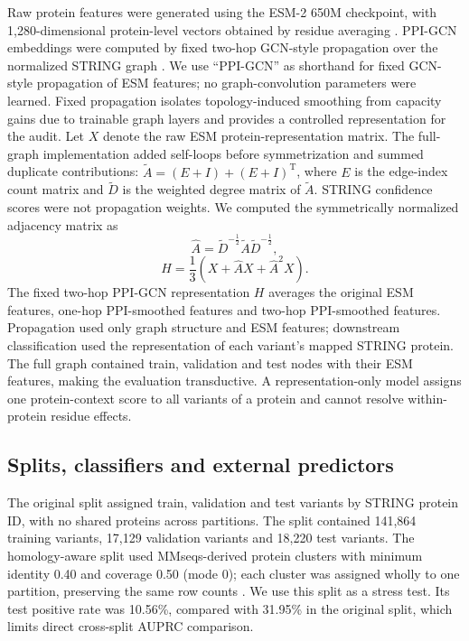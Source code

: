 \documentclass[conference]{IEEEtran}
\begin{document}
Raw protein features were generated using the ESM-2 650M checkpoint, with 1,280-dimensional protein-level vectors obtained by residue averaging \cite{Lin2023ESM}. PPI-GCN embeddings were computed by fixed two-hop GCN-style propagation over the normalized STRING graph \cite{Kipf2017GCN}. We use ``PPI-GCN'' as shorthand for fixed GCN-style propagation of ESM features; no graph-convolution parameters were learned. Fixed propagation isolates topology-induced smoothing from capacity gains due to trainable graph layers and provides a controlled representation for the audit. Let $X$ denote the raw ESM protein-representation matrix. The full-graph implementation added self-loops before symmetrization and summed duplicate contributions: $\tilde{A}=(E+I)+(E+I)^{\mathrm{T}}$, where $E$ is the edge-index count matrix and $\tilde{D}$ is the weighted degree matrix of $\tilde{A}$. STRING confidence scores were not propagation weights. We computed the symmetrically normalized adjacency matrix as
\begin{equation}
\hat{A}=\tilde{D}^{-\frac{1}{2}}\tilde{A}\tilde{D}^{-\frac{1}{2}},
\end{equation}
\begin{equation}
H=\frac{1}{3}\left(X+\hat{A}X+\hat{A}^{2}X\right).
\end{equation}
The fixed two-hop PPI-GCN representation $H$ averages the original ESM features, one-hop PPI-smoothed features and two-hop PPI-smoothed features. Propagation used only graph structure and ESM features; downstream classification used the representation of each variant's mapped STRING protein. The full graph contained train, validation and test nodes with their ESM features, making the evaluation transductive. A representation-only model assigns one protein-context score to all variants of a protein and cannot resolve within-protein residue effects.

\subsection{Splits, classifiers and external predictors}

The original split assigned train, validation and test variants by STRING protein ID, with no shared proteins across partitions. The split contained 141,864 training variants, 17,129 validation variants and 18,220 test variants. The homology-aware split used MMseqs-derived protein clusters with minimum identity 0.40 and coverage 0.50 (mode 0); each cluster was assigned wholly to one partition, preserving the same row counts \cite{Steinegger2017MMseqs2}. We use this split as a stress test. Its test positive rate was 10.56\%, compared with 31.95\% in the original split, which limits direct cross-split AUPRC comparison.
\end{document}
